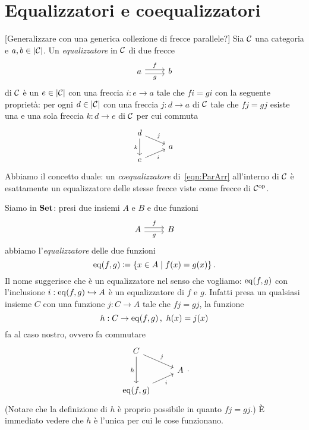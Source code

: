 
\section{Equalizzatori e coequalizzatori}

\begin{definizione}
{\color{red} [Generalizzare con una generica collezione di frecce parallele?]}
Sia \(\mathcal C\) una categoria e \(a, b \in \lvert\mathcal C\rvert\). Un {\em equalizzatore} in \(\mathcal C\) di due frecce
\begin{equation}\begin{tikzcd}
a \ar["f", r, shift left] \ar["g", swap, r, shift right] & b
\end{tikzcd}\label{eqn:ParArr}\end{equation}
di \(\mathcal C\) è un \(e \in \lvert\mathcal C\rvert\) con una freccia \(i : e \to a\) tale che \(fi = gi\) con la seguente proprietà: per ogni \(d \in \lvert\mathcal C\rvert\) con una freccia \(j : d \to a\) di \(\mathcal C\) tale che \(fj = gj\) esiste una e una sola freccia \(k : d \to e\) di \(\mathcal C\) per cui commuta
\[\begin{tikzcd}[row sep=tiny]
d \ar["j", dr] \ar["k", swap, dd] &   \\
                                  & a \\
e \ar["i", swap, ur]              &          
\end{tikzcd}\]
Abbiamo il concetto duale: un {\em coequalizzatore} di~\eqref{eqn:ParArr} all'interno di \(\mathcal C\) è esattamente un equalizzatore delle stesse frecce viste come frecce di \(\mathcal C^\text{op}\).
\end{definizione}

\begin{esempio}
Siamo in \(\mathbf{Set}\): presi due insiemi \(A\) e \(B\) e due funzioni
\[\begin{tikzcd}
A \ar["f", r, shift left] \ar["g", swap, r, shift right] & B
\end{tikzcd}\]
abbiamo l'{\em equalizzatore} delle due funzioni
\[\operatorname{eq}(f, g) \coloneq \left\{x \in A \mid f(x) = g(x)\right\}.\]
Il nome suggerisce che è un equalizzatore nel senso che vogliamo: \(\operatorname{eq}(f, g)\) con l'inclusione \(i : \operatorname{eq}(f, g) \hookrightarrow A\) è un equalizzatore di \(f\) e \(g\). Infatti presa un qualsiasi insieme \(C\) con una funzione \(j : C \to A\) tale che \(fj = gj\), la funzione
\[h : C \to \operatorname{eq}(f, g)\,, \ h(x) = j(x)\]
fa al caso nostro, ovvero fa commutare
\[\begin{tikzcd}[row sep=small]
C \ar["j", dr] \ar["h", swap, dd] \\
 & A \\
\eq(f, g) \ar["i", swap, ur]
\end{tikzcd}.\]
(Notare che la definizione di \(h\) è proprio possibile in quanto \(fj = gj\).) È immediato vedere che \(h\) è l'unica per cui le cose funzionano.
\end{esempio}


